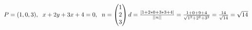 \subsection{}
\begin{math}
    P=(1,0,3),
    \hspace{6px}
    x+2y+3x+4=0,
    \hspace{6px}
    n=\begin{pmatrix}
        1\\
        2\\
        3
    \end{pmatrix}
    \\
    d
    =\frac{|1+2*0+3*3+4|}{||n||}
    =\frac{1+0+9+4}{\sqrt{1^2+2^2+3^2}}
    =\frac{14}{\sqrt{14}}
    =\sqrt{14}
\end{math}